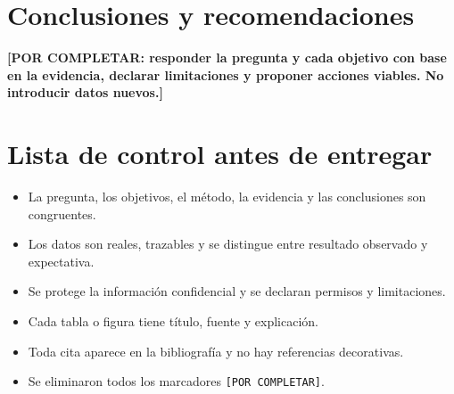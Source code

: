 \documentclass[spanish,letterpaper,oneside]{article}
\newcommand{\porcompletar}[1]{\textcolor{uasBlue}{\textbf{[POR COMPLETAR: #1]}}}
\begin{document}
\section{Conclusiones y recomendaciones}
\porcompletar{responder la pregunta y cada objetivo con base en la evidencia, declarar limitaciones y proponer acciones viables. No introducir datos nuevos.}

\section*{Lista de control antes de entregar}
\begin{itemize}
  \item La pregunta, los objetivos, el método, la evidencia y las conclusiones son congruentes.
  \item Los datos son reales, trazables y se distingue entre resultado observado y expectativa.
  \item Se protege la información confidencial y se declaran permisos y limitaciones.
  \item Cada tabla o figura tiene título, fuente y explicación.
  \item Toda cita aparece en la bibliografía y no hay referencias decorativas.
  \item Se eliminaron todos los marcadores \texttt{[POR COMPLETAR]}.
\end{itemize}


\end{document}

